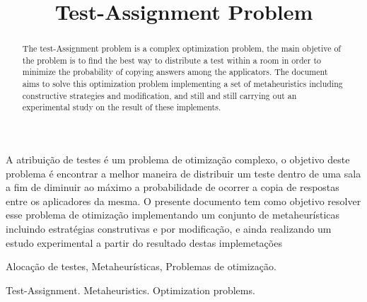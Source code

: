 \documentclass[a4paper,11pt]{article}
\begin{document}
\title{Test-Assignment Problem} 

\maketitle
\thispagestyle{fancy}

\author{
}

\author{ 
}

\vspace{8mm}
\begin{resumo}
A atribui\c c\~ao de testes \'e um problema de otimiza\c c\~ao complexo, o objetivo deste problema \'e encontrar a melhor maneira de 
distribuir um teste dentro de uma sala a fim de diminuir ao m\'aximo a probabilidade de ocorrer a copia de respostas 
entre os aplicadores da mesma. O presente documento tem como objetivo resolver esse problema de otimiza\c c\~ao implementando 
um conjunto de metaheur\'isticas incluindo estrat\'egias construtivas e por modifica\c c\~ao, e ainda realizando um estudo experimental a partir do resultado 
destas implemeta\c c\~oes
 \end{resumo}

\bigskip
\begin{palchaves}
Aloca\c c\~ao de testes, Metaheur\'isticas, Problemas de otimiza\c c\~ao.

\end{palchaves}


\vspace{8mm}

\begin{abstract}
The test-Assignment problem is a complex optimization problem, the main objetive of the problem is to find the best way to distribute a test within 
a room in order to minimize the probability of copying answers among the applicators. The document aims to solve this optimization problem implementing a
set of metaheuristics including constructive strategies and modification, and still and still carrying out an experimental study on the result
of these implements.

\end{abstract}

\bigskip
\begin{keywords}
Test-Assignment. Metaheuristics. Optimization problems.

\end{keywords}
\end{document}
